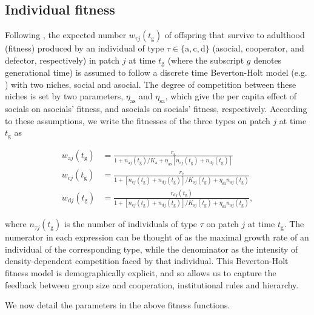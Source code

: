\documentclass{rstb}
\begin{document}
\begin{linenumbers}
\subsection*{Individual fitness}
Following \cite{Powers:2013:a}, the expected number $w_{\tau j}(t_\mathrm{g})$ of offspring that survive to adulthood (fitness) produced by an individual of type $\tau \in\{\mathrm{a},\mathrm{c},\mathrm{d}\}$ (asocial, cooperator, and defector, respectively) in patch $j$ at time $t_\mathrm{g}$ (where the subscript $g$ denotes generational time) is assumed to follow a discrete time Beverton-Holt model (e.g. \cite{Chow:2012:a}) with two niches, social and asocial. The degree of competition between these niches is set by two parameters, $\eta_{\mathrm{as}}$ and $\eta_{\mathrm{sa}}$, which give the per capita effect of socials on asocials' fitness, and asocials on socials' fitness, respectively. According to these assumptions, we write the fitnesses of the three types on patch $j$ at time $t_\mathrm{g}$ as
\begin{linenomath}
\begin{align}
\label{eqnwl}
w_{\mathrm{a}j}(t_\mathrm{g}) &= \frac{r_{\mathrm{a}}}{1 + n_{\mathrm{a}j}(t_\mathrm{g})/K_\mathrm{a}+\eta_{\mathrm{as}}\left[n_{\mathrm{c}j}(t_\mathrm{g})+n_{\mathrm{d}j}(t_\mathrm{g})\right]}  \nonumber\\
w_{\mathrm{c}j}(t_\mathrm{g}) &= \frac{r_{\mathrm{c}}}{1 + \left[n_{\mathrm{c}j}(t_\mathrm{g})+n_{\mathrm{d}j}(t_\mathrm{g}) \right]/K_{\mathrm{s}j}(t_\mathrm{g}) +\eta_{\mathrm{sa}}n_{\mathrm{a}j}(t_\mathrm{g})}\nonumber\\
w_{\mathrm{d}j}(t_\mathrm{g}) &= \frac{r_{\mathrm{d}j}(t_\mathrm{g})}{1 + \left[n_{\mathrm{c}j}(t_\mathrm{g})+n_{\mathrm{d}j}(t_\mathrm{g})\right]/K_{\mathrm{s}j}(t_\mathrm{g}) +\eta_{\mathrm{sa}}n_{\mathrm{a}j}(t_\mathrm{g})}, 
\end{align}
\end{linenomath}
where $n_{\tau j}(t_\mathrm{g})$ is the number of individuals of type $\tau$ on patch $j$ at time $t_\mathrm{g}$. The numerator in each expression can be thought of as the maximal growth rate of an individual of the corresponding type, while the denominator as the intensity of density-dependent competition faced by that individual. This Beverton-Holt fitness model is demographically explicit, and so allows us to capture the feedback between group size and cooperation, institutional rules and hierarchy. 

We now detail the parameters in the above fitness functions.


\end{linenumbers}
\end{document}
